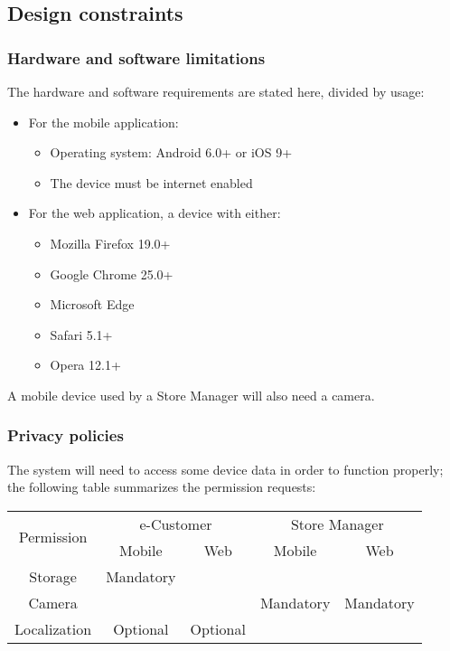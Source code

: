 
\subsection{Design constraints}

\subsubsection{Hardware and software limitations}
The hardware and software requirements are stated here, divided by usage:
\begin{itemize}[itemsep=-1mm, topsep=-1mm]
	\item For the mobile application: 
	\begin{itemize}[itemsep=-1mm, topsep=-1mm]
		\item Operating system: Android 6.0+ or iOS 9+
		\item The device must be internet enabled
	\end{itemize}
	
	\item For the web application, a device with either:
	\begin{itemize}[itemsep=-1mm, topsep=-1mm]
		\item Mozilla Firefox 19.0+
		\item Google Chrome 25.0+
		\item Microsoft Edge 
		\item Safari 5.1+
		\item Opera 12.1+
	\end{itemize}
\end{itemize}	
A mobile device used by a Store Manager will also need a camera.

\subsubsection{Privacy policies}
The system will need to access some device data in order to function properly; the following table summarizes the permission requests:

\begin{center}
	\begin{tabular}{c | c | c | c | c }
		\multirow{2}{*}{Permission} & \multicolumn{2}{c|}{e-Customer} & \multicolumn{2}{c}{Store Manager} \\ \cline{2-5}
		                            & Mobile & Web                    & Mobile & Web                      \\ \hline
		          Storage           & Mandatory      &                       &       &  \\
		          Camera &  &  & Mandatory & Mandatory \\
		          Localization & Optional & Optional &  & 
	\end{tabular}
\end{center}

